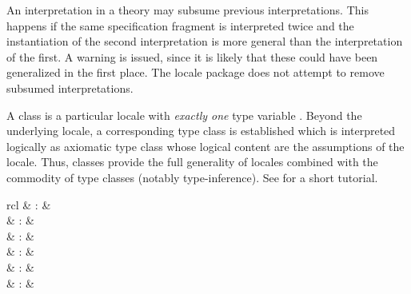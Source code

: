 \begin{isabellebody}
\begin{isamarkuptext}
  \begin{warn}
    An interpretation in a theory may subsume previous
    interpretations.  This happens if the same specification fragment
    is interpreted twice and the instantiation of the second
    interpretation is more general than the interpretation of the
    first.  A warning is issued, since it is likely that these could
    have been generalized in the first place.  The locale package does
    not attempt to remove subsumed interpretations.
  \end{warn}%
\end{isamarkuptext}%
\isamarkuptrue%
%
\isamarkuptrue%
%
\begin{isamarkuptext}%
A class is a particular locale with \emph{exactly one} type variable
  \isa{{\isasymalpha}}.  Beyond the underlying locale, a corresponding type class
  is established which is interpreted logically as axiomatic type
  class \cite{Wenzel:1997:TPHOL} whose logical content are the
  assumptions of the locale.  Thus, classes provide the full
  generality of locales combined with the commodity of type classes
  (notably type-inference).  See \cite{isabelle-classes} for a short
  tutorial.

  \begin{matharray}{rcl}
    \hypertarget{command.class}{\hyperlink{command.class}{\mbox{}}} & : &  \\
    \hypertarget{command.instantiation}{\hyperlink{command.instantiation}{\mbox{}}} & : &  \\
    \hypertarget{command.instance}{\hyperlink{command.instance}{\mbox{}}} & : &  \\
    \hypertarget{command.subclass}{\hyperlink{command.subclass}{\mbox{}}} & : &  \\
    \hypertarget{command.print_classes}{\hyperlink{command.print_classes}{\mbox{}}}\isa{{\isachardoublequote}\isactrlsup {\isacharasterisk}{\isachardoublequote}} & : &  \\
    \hypertarget{method.intro_classes}{\hyperlink{method.intro_classes}{\mbox{}}} & : & \isarmeth \\
  \end{matharray}


\end{isamarkuptext}
\end{isabellebody}
